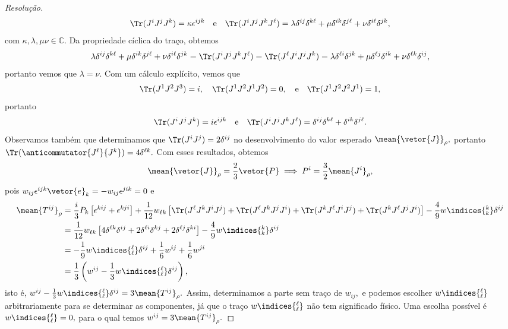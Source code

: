 \begin{proof}[Resolução]
\begin{equation*}
        \Tr(J^i J^j J^k) = \kappa \epsilon^{ijk}
        \quad\text{e}\quad
        \Tr(J^i J^j J^k J^\ell) = \lambda \delta^{ij} \delta^{k\ell} + \mu \delta^{i k} \delta^{j \ell} + \nu \delta^{i \ell} \delta^{jk},
    \end{equation*}
    com \(\kappa, \lambda, \mu \nu \in \mathbb{C}\). Da propriedade cíclica do traço, obtemos
    \begin{equation*}
        \lambda \delta^{i j} \delta^{k \ell} + \mu \delta^{i k} \delta^{j \ell} + \nu \delta^{i \ell} \delta^{j k} = \Tr(J^i J^j J^k J^\ell) = \Tr(J^\ell J^i J^j J^k) = 
        \lambda \delta^{\ell i} \delta^{j k} + \mu \delta^{\ell j} \delta^{i k} + \nu \delta^{\ell k} \delta^{i j},
    \end{equation*}
    portanto vemos que \(\lambda = \nu.\) Com um cálculo explícito, vemos que 
    \begin{equation*}
        \Tr(J^1 J^2 J^3) = i,\quad\Tr(J^1 J^2 J^1 J^2) = 0,\quad\text{e}\quad\Tr(J^1 J^2 J^2 J^1) = 1, 
    \end{equation*}
    portanto 
    \begin{equation*}
        \Tr(J^i J^j J^k) = i \epsilon^{ijk}
        \quad\text{e}\quad
        \Tr(J^i J^j J^k J^\ell) = \delta^{ij} \delta^{k \ell} + \delta^{ik} \delta^{j \ell}.
    \end{equation*}
    Observamos também que determinamos que \(\Tr(J^i J^j) = 2 \delta^{ij}\) no desenvolvimento do valor esperado \(\mean{\vetor{J}}_\rho,\) portanto \(\Tr(\anticommutator{J^\ell}{J^k}) = 4 \delta^{\ell k}.\) Com esses resultados, obtemos
    \begin{equation*}
        \mean{\vetor{J}}_{\rho} = \frac23 \vetor{P} \implies P^i = \frac32 \mean{J^i}_\rho,
    \end{equation*}
    pois \(w_{ij} \epsilon^{ijk} \vetor{e}_k = - w_{ij} \epsilon^{jik} = 0\) e
    \begin{align*}
        \mean{T^{ij}}_{\rho} &= \frac{i}{3} P_k \left[\epsilon^{kij} + \epsilon^{kji}\right] + \frac1{12} w_{\ell k} \left[\Tr(J^\ell J^k J^i J^j) + \Tr(J^\ell J^k J^j J^i) + \Tr(J^k J^\ell J^i J^j) + \Tr(J^k J^\ell J^j J^i)\right] - \frac49 w\indices{^k_k} \delta^{ij} \\
                             &= \frac{1}{12} w_{\ell k} \left[4\delta^{\ell k} \delta^{ij} + 2\delta^{\ell i} \delta^{kj} + 2\delta^{\ell j} \delta^{ki}\right] - \frac49 w\indices{^k_k} \delta^{ij}\\
                             &= -\frac19w\indices{^\ell_\ell}\delta^{ij} + \frac16 w^{ij} + \frac16 w^{ji}\\
                             &= \frac13 \left(w^{ij} - \frac13w\indices{^\ell_\ell} \delta^{ij}\right),
    \end{align*}
    isto é, \(w^{ij} - \frac13 w\indices{^\ell_\ell} \delta^{ij} = 3\mean{T^{ij}}_{\rho}.\) Assim, determinamos a parte sem traço de \(w_{ij},\) e podemos escolher \(w\indices{^\ell_\ell}\) arbitrariamente para se determinar as componentes, já que o traço \(w\indices{^\ell_\ell}\) não tem significado físico. Uma escolha possível é \(w\indices{^\ell_\ell} = 0,\) para o qual temos \(w^{ij} = 3\mean{T^{ij}}_\rho.\)
\end{proof}
